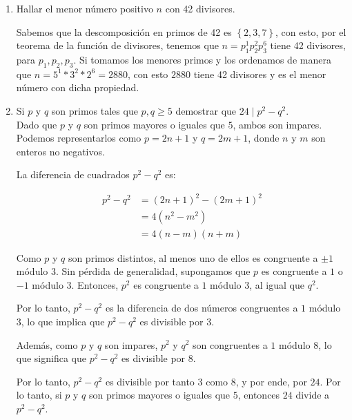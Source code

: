 \documentclass{report}
\begin{document}
\begin{enumerate}
        \item Hallar el menor número positivo $n$ con 42 divisores.

        Sabemos que la descomposición en primos de 42 es $\left\{ 2,3,7 \right\}$, con esto, por el teorema de la función de divisores, tenemos que $n = p_1^1p_2^2p_3^6$ tiene 42 divisores, para $p_1, p_2, p_3$. Si tomamos los menores primos y los ordenamos de manera que $n = 5^1*3^2*2^6 = 2880$, con esto $2880$ tiene 42 divisores y es el menor número con dicha propiedad.

        \item Si $p$ y $q$ son primos tales que $p, q \geq 5$ demostrar que $24 \mid p^2 - q^2$.\\
        Dado que $p$ y $q$ son primos mayores o iguales que $5$, ambos son impares. Podemos representarlos como $p = 2n + 1$ y $q = 2m + 1$, donde $n$ y $m$ son enteros no negativos.

        La diferencia de cuadrados $p^2 - q^2$ es:

        \begin{align*}
            p^2 - q^2 &= (2n + 1)^2 - (2m + 1)^2 \\
            &= 4(n^2 - m^2) \\
            &= 4(n - m)(n + m)
        \end{align*}

        Como $p$ y $q$ son primos distintos, al menos uno de ellos es congruente a $\pm 1$ módulo $3$. Sin pérdida de generalidad, supongamos que $p$ es congruente a $1$ o $-1$ módulo $3$. Entonces, $p^2$ es congruente a $1$ módulo $3$, al igual que $q^2$.

        Por lo tanto, $p^2 - q^2$ es la diferencia de dos números congruentes a $1$ módulo $3$, lo que implica que $p^2 - q^2$ es divisible por $3$.

        Además, como $p$ y $q$ son impares, $p^2$ y $q^2$ son congruentes a $1$ módulo $8$, lo que significa que $p^2 - q^2$ es divisible por $8$.

        Por lo tanto, $p^2 - q^2$ es divisible por tanto $3$ como $8$, y por ende, por $24$. Por lo tanto, si $p$ y $q$ son primos mayores o iguales que $5$, entonces $24$ divide a $p^2 - q^2$.
    \end{enumerate}
\end{document}
